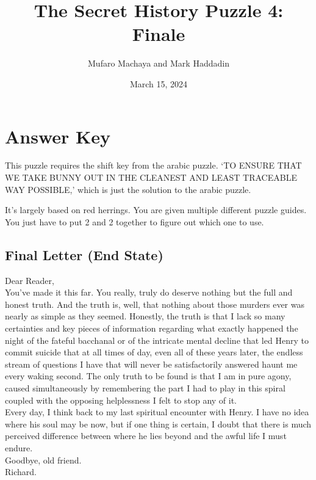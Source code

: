 \documentclass[11pt]{article}
\title{The Secret History Puzzle 4: Finale}
\author{Mufaro Machaya and Mark Haddadin}
\date{March 15, 2024}
\begin{document}
\begin{titlingpage}
\maketitle
\end{titlingpage}

\newpage

\section*{Answer Key}

This puzzle requires the shift key from the arabic puzzle. `TO ENSURE THAT WE TAKE BUNNY OUT IN THE CLEANEST AND LEAST TRACEABLE WAY POSSIBLE,' which is just the solution to the arabic puzzle.

It's largely based on red herrings. You are given multiple different puzzle guides. You just have to put 2 and 2 together to figure out which one to use.

\subsection*{Final Letter (End State)}

Dear Reader, \\

You've made it this far. You really, truly do deserve nothing but the full and honest truth. And the truth is, well, that nothing about those murders ever was nearly as simple as they seemed. Honestly, the truth is that I lack so many certainties and key pieces of information regarding what exactly happened the night of the fateful bacchanal or of the intricate mental decline that led Henry to commit suicide that at all times of day, even all of these years later, the endless stream of questions I have that will never be satisfactorily answered haunt me every waking second. The only truth to be found is that I am in pure agony, caused simultaneously by remembering the part I had to play in this spiral coupled with the opposing helplessness I felt to stop any of it. \\

Every day, I think back to my last spiritual encounter with Henry. I have no idea where his soul may be now, but if one thing is certain, I doubt that there is much perceived difference between where he lies beyond and the awful life I must endure. \\

Goodbye, old friend. \\

Richard.
\end{document}
